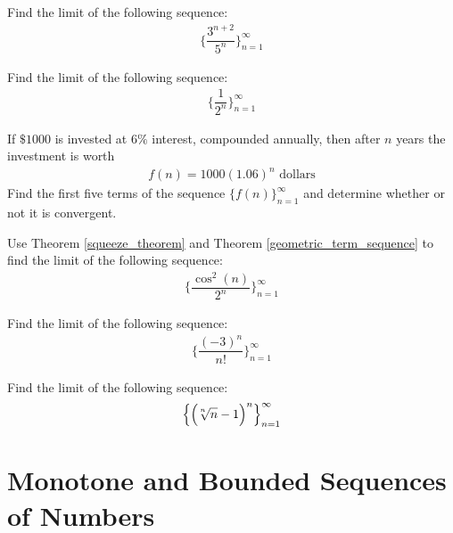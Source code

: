 \begin{exercise}
Find the limit of the following sequence:
\begin{align*}
    \Big\{\dfrac{3^{n+2}}{5^{n}}\Big\}_{n=1}^{\infty}
\end{align*}
\end{exercise}

\begin{exercise}
Find the limit of the following sequence:
\begin{align*}
    \Big\{\dfrac{1}{2^{n}}\Big\}_{n=1}^{\infty}
\end{align*}
\end{exercise}

\begin{exercise}
If $\$1000$ is invested at $6\%$ interest, compounded annually, then after $n$ years the investment is worth
\begin{align*}
    f(n) = 1000(1.06)^{n} \hspace{4pt} \text{dollars}
\end{align*}
Find the first five terms of the sequence $\{f(n)\}_{n=1}^{\infty}$ and determine whether or not it is convergent.
\end{exercise}

\begin{exercise}
Use Theorem \ref{squeeze_theorem} and Theorem \ref{geometric_term_sequence} to find the limit of the following sequence:
\begin{align*}
    \Big\{\dfrac{\cos^{2}(n)}{2^{n}}\Big\}_{n=1}^{\infty}
\end{align*}
\end{exercise}

\begin{exercise}
Find the limit of the following sequence:
\begin{align*}
    \Big\{\dfrac{(-3)^{n}}{n!}\Big\}_{n=1}^{\infty}
\end{align*}
\end{exercise}

\begin{exercise}
Find the limit of the following sequence:
\begin{align*}
    \Big\{\Big(\sqrt[\leftroot{2}\uproot{2}n]{n} - 1\Big)^{n}\Big\}_{n=1}^{\infty}
\end{align*}
\end{exercise}

\newpage
\section{Monotone and Bounded Sequences of Numbers}

